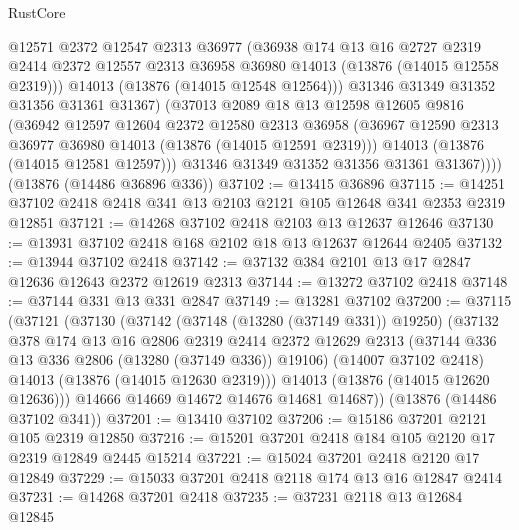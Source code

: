 \begin{lexlean}{RustCore}
\begin{coremodule}
              @12571
              @2372
              @12547
              @2313
              @36977
              (@36938
                @174
                @13
                @16
                @2727
                @2319
                @2414
                @2372
                @12557
                @2313
                @36958
                @36980
                @14013
                (@13876 (@14015 @12558 @2319)))
              @14013
              (@13876 (@14015 @12548 @12564)))
            @31346
            @31349
            @31352
            @31356
            @31361
            @31367)
          (@37013
            @2089
            @18
            @13
            @12598
            @12605
            @9816
            (@36942
              @12597
              @12604
              @2372
              @12580
              @2313
              @36958
              (@36967 @12590 @2313 @36977 @36980 @14013 (@13876 (@14015 @12591 @2319)))
              @14013
              (@13876 (@14015 @12581 @12597)))
            @31346
            @31349
            @31352
            @31356
            @31361
            @31367))))
    (@13876 (@14486 @36896 @336))
@37102 := @13415 @36896
@37115 := @14251 @37102 @2418 @2418 @341 @13 @2103 @2121 @105 @12648 @341 @2353 @2319 @12851
@37121 := @14268 @37102 @2418 @2103 @13 @12637 @12646
@37130 := @13931 @37102 @2418 @168 @2102 @18 @13 @12637 @12644 @2405
@37132 := @13944 @37102 @2418
@37142 := @37132 @384 @2101 @13 @17 @2847 @12636 @12643 @2372 @12619 @2313
@37144 := @13272 @37102 @2418
@37148 := @37144 @331 @13 @331 @2847
@37149 := @13281 @37102
@37200 := @37115
    (@37121
      (@37130
        (@37142
          (@37148 (@13280 (@37149 @331)) @19250)
          (@37132
            @378
            @174
            @13
            @16
            @2806
            @2319
            @2414
            @2372
            @12629
            @2313
            (@37144 @336 @13 @336 @2806 (@13280 (@37149 @336)) @19106)
            (@14007 @37102 @2418)
            @14013
            (@13876 (@14015 @12630 @2319)))
          @14013
          (@13876 (@14015 @12620 @12636)))
        @14666
        @14669
        @14672
        @14676
        @14681
        @14687))
    (@13876 (@14486 @37102 @341))
@37201 := @13410 @37102
@37206 := @15186 @37201 @2121 @105 @2319 @12850
@37216 := @15201 @37201 @2418 @184 @105 @2120 @17 @2319 @12849 @2445 @15214
@37221 := @15024 @37201 @2418 @2120 @17 @12849
@37229 := @15033 @37201 @2418 @2118 @174 @13 @16 @12847 @2414
@37231 := @14268 @37201 @2418
@37235 := @37231 @2118 @13 @12684 @12845

\end{coremodule}
\end{lexlean}
